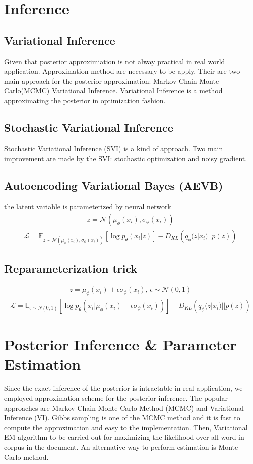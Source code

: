 \section{Inference}
\subsection{Variational Inference}
Given that posterior approximiation is not alway practical in real world application. Approximation method are necessary to be apply. Their are two main approach for the posterior approximation: Markov Chain Monte Carlo(MCMC) Variational Inference. Variational Inference is a method approximating the posterior in optimization fashion.
\subsection{Stochastic Variational Inference}
Stochastic Variational Inference (SVI) is a kind of approach. 
Two main improvement are made by the SVI: stochastic optimization and noisy gradient. 
\subsection{Autoencoding Variational Bayes (AEVB)}
the latent variable is parameterized by neural network
\begin{align*}
z = \mathcal{N}(\mu_{\phi}(x_i), \sigma_{\phi}(x_i))
\end{align*}
\begin{align*}
\mathcal{L}=\mathbb{E}_{z\sim\mathcal{N}(\mu_{\phi}(x_i),\sigma_\phi(x_i))}\left[\log p_\theta(x_i|z)\right]-D_{KL}\left(q_\phi(z|x_i)||p(z)\right)
\end{align*}
\subsection{Reparameterization trick}
\begin{align*}
z= \mu_{\phi}(x_i)+\epsilon\sigma_\phi(x_i)\text{, }\epsilon\sim\mathcal{N}(0,1)
\end{align*}
\begin{align*}
\mathcal{L}=\mathbb{E}_{\epsilon\sim N(0,1)}\left[\log p_\theta(x_i|\mu_{\phi}(x_i)+\epsilon\sigma_\phi(x_i))\right]-D_{KL}\left(q_\phi(z|x_i)||p(z)\right)
\end{align*}
\section{Posterior Inference \& Parameter Estimation} Since the exact inference of the posterior is intractable in real application, we employed approximation scheme for the posterior inference. The popular approaches are Markov Chain Monte Carlo Method (MCMC) and Variational Inference (VI)\cite{blei_variational_2006,hoffman_stochastic_2013}. Gibbs sampling is one of the MCMC method and it is fast to compute the approximation and easy to the implementation. Then, Variational EM algorithm to be carried out for maximizing the likelihood over all word in corpus in the document. An alternative way to perform estimation is Monte Carlo method.

